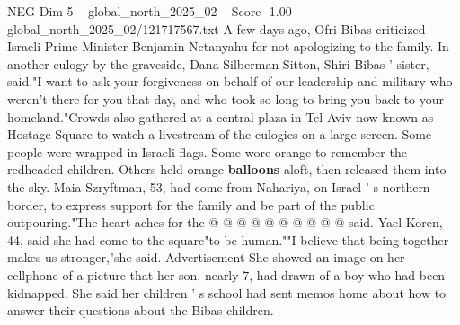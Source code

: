 \begin{textsample}{NEG Dim 5 – global\_north\_2025\_02 – Score -1.00 – global\_north\_2025\_02/121717567.txt}
A few days ago, Ofri Bibas criticized Israeli Prime Minister Benjamin Netanyahu for not apologizing to the family.
In another eulogy by the graveside, Dana Silberman Sitton, Shiri Bibas ' sister, said,"I want to ask your forgiveness on behalf of our leadership and military who weren't there for you that day, and who took so long to bring you back to your homeland."Crowds also gathered at a central plaza in Tel Aviv now known as Hostage Square to watch a livestream of the eulogies on a large screen.
Some people were wrapped in Israeli flags.
Some wore orange to remember the redheaded children.
Others held orange \textbf{balloons} aloft, then released them into the sky.
Maia Szryftman, 53, had come from Nahariya, on Israel ' s northern border, to express support for the family and be part of the public outpouring."The heart aches for the @ @ @ @ @ @ @ @ @ @ said.
Yael Koren, 44, said she had come to the square"to be human.""I believe that being together makes us stronger,"she said.
Advertisement She showed an image on her cellphone of a picture that her son, nearly 7, had drawn of a boy who had been kidnapped.
She said her children ' s school had sent memos home about how to answer their questions about the Bibas children.

\end{textsample}
